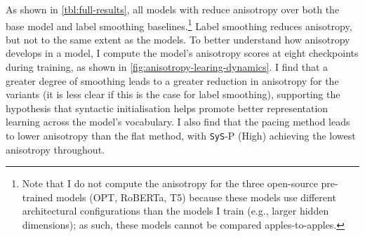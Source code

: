 As shown in \cref{tbl:full-results}, all models with \smoothing reduce anisotropy over both the base model and label smoothing baselines.\footnote{Note that I do not compute the anisotropy for the three open-source pre-trained models (OPT, RoBERTa, T5) because these models use different architectural configurations than the models I train (e.g., larger hidden dimensions); as such, these models cannot be compared apples-to-apples.} Label smoothing reduces anisotropy, but not to the same extent as the \smoothing models. To better understand how anisotropy develops in a model, I compute the model's anisotropy scores at eight checkpoints during training, as shown in \cref{fig:anisotropy-learing-dynamics}. I find that a greater degree of smoothing leads to a greater reduction in anisotropy for the \smoothing variants (it is less clear if this is the case for label smoothing), supporting the hypothesis that syntactic initialisation helps promote better representation learning across the model's vocabulary. I also find that the pacing method leads to lower anisotropy than the flat method, with \texttt{SyS}-P (High) achieving the lowest anisotropy throughout.

